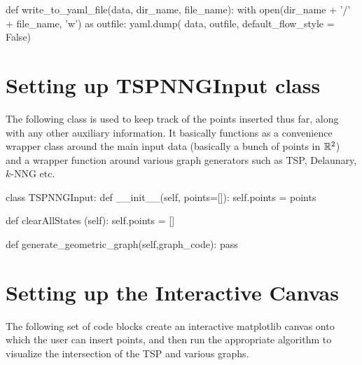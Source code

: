 \nwenddocs{}\plusendmoddef\nwstartdeflinemarkup{}\nwenddeflinemarkup
def write_to_yaml_file(data, dir_name, file_name):
   with open(dir_name + '/' + file_name, 'w') as outfile:
          yaml.dump( data, outfile, default_flow_style = False)
\nwendcode{}\nwdocspar


\section{Setting up TSPNNGInput class}

The following class is used to keep track of the points inserted thus far, along with 
any other auxiliary information. It basically functions as a convenience wrapper class around 
the main input data (basically a bunch of points in $\mathbb{R}^2$) and a wrapper function around 
various graph generators such as TSP, Delaunary, $k\text{-}$NNG etc. 

\nwenddocs{}\plusendmoddef\nwstartdeflinemarkup{}\nwenddeflinemarkup
class TSPNNGInput:
      def __init__(self, points=[]):
          self.points            = points

      def clearAllStates (self):
          self.points = []

      def generate_geometric_graph(self,graph_code):
           pass
\nwendcode{}\nwdocspar

\section{Setting up the Interactive Canvas}
The following set of code blocks create an interactive matplotlib canvas onto which the user can insert points, and then 
run the appropriate algorithm to visualize the intersection of the TSP and various graphs. 

